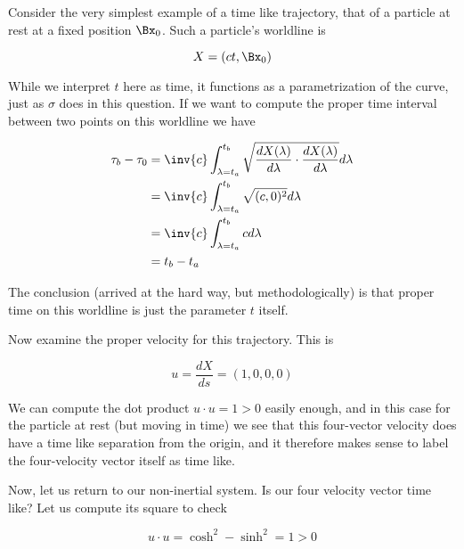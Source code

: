 {Consider the very simplest example of a time like trajectory, that of a particle at rest at a fixed position \(\Bx_0\).  Such a particle's worldline is

\begin{equation}\label{eqn:relativisticElectrodynamicsT2:71}
X = ( c t, \Bx_0 )
\end{equation}

While we interpret \(t\) here as time, it functions as a parametrization of the curve, just as \(\sigma\) does in this question.  If we want to compute the proper time interval between two points on this worldline we have

\begin{equation}\label{eqn:relativisticElectrodynamicsT2:2140}
\begin{aligned}
\tau_b - \tau_0 
&=
\inv{c} \int_{\lambda = t_a}^{t_b} \sqrt{ \frac{dX(\lambda)}{d\lambda} \cdot \frac{dX(\lambda)}{d\lambda} } d\lambda \\
&=
\inv{c} \int_{\lambda = t_a}^{t_b} \sqrt{ (c, 0)^2 } d\lambda \\
&=
\inv{c} \int_{\lambda = t_a}^{t_b} c d\lambda \\
&= t_b - t_a
\end{aligned}
\end{equation}

The conclusion (arrived at the hard way, but methodologically) is that proper time on this worldline is just the parameter \(t\) itself.

Now examine the proper velocity for this trajectory.  This is

\begin{equation}\label{eqn:relativisticElectrodynamicsT2:72}
u = \frac{dX}{ds} = (1, 0, 0, 0)
\end{equation}

We can compute the dot product \(u \cdot u = 1 > 0\) easily enough, and in this case for the particle at rest (but moving in time) we see that this four-vector velocity does have a time like separation from the origin, and it therefore makes sense to label the four-velocity vector itself as time like.

Now, let us return to our non-inertial system.  Is our four velocity vector time like?  Let us compute its square to check

\begin{equation}\label{eqn:relativisticElectrodynamicsT2:90}
u \cdot u = \cosh^2 - \sinh^2 = 1 > 0
\end{equation}

}
